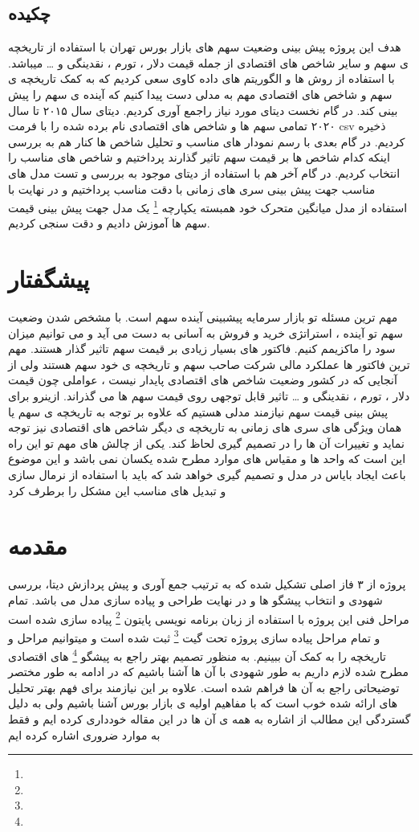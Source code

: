 \documentclass[12pt]{report}
\begin{document}
\section*{چکیده}
هدف این پروژه پیش بینی وضعیت سهم های بازار بورس تهران با استفاده از تاریخچه ی سهم و سایر شاخص های اقتصادی از جمله قیمت دلار ، تورم ، نقدینگی و … میباشد. با استفاده از روش ها و الگوریتم های داده کاوی سعی کردیم که به کمک تاریخچه ی سهم و شاخص های اقتصادی مهم به مدلی دست پیدا کنیم که آینده ی سهم را پیش بینی کند. در گام نخست دیتای مورد نیاز راجمع آوری کردیم. دیتای سال ۲۰۱۵ تا سال ۲۰۲۰ تمامی سهم ها و شاخص های اقتصادی نام برده شده را با فرمت csv ذخیره کردیم. در گام بعدی با رسم نمودار های مناسب و تحلیل شاخص ها کنار هم به بررسی اینکه کدام شاخص ها بر قیمت سهم تاثیر گذارند پرداختیم و شاخص های مناسب را انتخاب کردیم. در گام آخر هم با استفاده از دیتای موجود به بررسی و تست مدل های مناسب جهت پیش بینی سری های زمانی با دقت مناسب پرداختیم و در نهایت با استفاده از 
مدل میانگین متحرک خود همبسته یکپارچه
\footnote{}
یک مدل جهت پیش بینی قیمت سهم ها آموزش دادیم و دقت سنجی کردیم.

\chapter*{پیشگفتار }


مهم ترین مسئله تو بازار سرمایه پیشبینی آینده سهم است. با مشخص شدن وضعیت سهم تو آینده ، استراتژی خرید و فروش به آسانی به دست می آید و می توانیم میزان سود را ماکزیمم کنیم. فاکتور های بسیار زیادی بر قیمت سهم تاثیر گذار هستند. مهم ترین فاکتور ها عملکرد مالی شرکت صاحب سهم و تاریخچه ی خود سهم هستند ولی از آنجایی که در کشور وضعیت شاخص های اقتصادی پایدار نیست ، عواملی چون قیمت دلار ، تورم ، نقدینگی و … تاثیر قابل توجهی روی قیمت سهم ها می گذراند. ازینرو برای پیش بینی قیمت سهم نیازمند مدلی هستیم که علاوه بر توجه به تاریخچه ی سهم یا همان ویژگی های سری های زمانی به تاریخچه ی دیگر شاخص های اقتصادی نیز توجه نماید و تغییرات آن ها را در تصمیم گیری لحاظ کند. یکی از چالش های مهم تو این راه این است که واحد ها و مقیاس های موارد مطرح شده یکسان نمی باشد و این موضوع باعث ایجاد بایاس در مدل و تصمیم گیری خواهد شد که باید با استفاده از نرمال سازی و تبدیل های مناسب این مشکل را برطرف کرد
\tableofcontents


\chapter{مقدمه}

\pagestyle{plain}
\setcounter{page}{1}
پروژه از ۳ فاز اصلی تشکیل شده که به ترتیب جمع آوری و پیش پردازش دیتا، بررسی شهودی و انتخاب پیشگو ها و در نهایت طراحی و پیاده سازی مدل می باشد.
تمام مراحل فنی این پروژه با استفاده از
زبان برنامه نویسی پایتون
\footnote{}
 پیاده سازی شده است و تمام مراحل پیاده سازی پروژه تحت
 گیت
\footnote{}
ثبت شده است و میتوانیم مراحل و تاریخچه را به کمک آن ببینیم.
به منظور تصمیم بهتر راجع به
پیشگو
\footnote{}
های اقتصادی مطرح شده لازم داریم به طور شهودی با آن ها آشنا باشیم که در ادامه به طور مختصر توضیحاتی راجع به آن ها فراهم شده است. 
علاوه بر این نیازمند برای فهم بهتر تحلیل های ارائه شده خوب است که با مفاهیم اولیه ی بازار بورس آشنا باشیم ولی به دلیل گستردگی این مطالب از اشاره به همه ی آن ها  در این مقاله  خودداری کرده ایم و فقط به موارد ضروری اشاره کرده ایم
\end{document}
